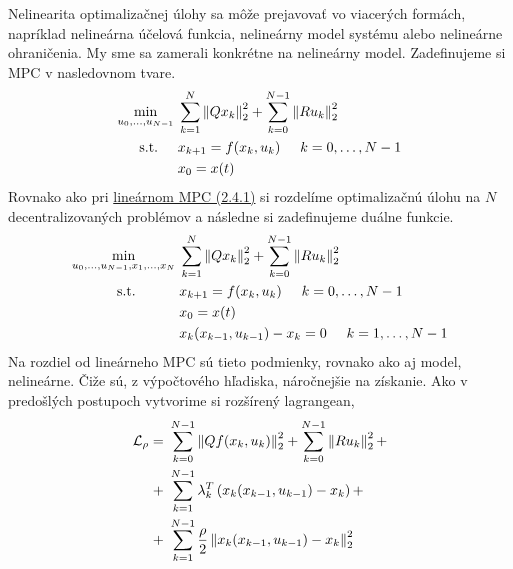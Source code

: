 Nelinearita optimalizačnej úlohy sa môže prejavovať vo viacerých formách, napríklad nelineárna účelová funkcia, nelineárny model systému alebo nelineárne ohraničenia. My sme sa zamerali konkrétne na nelineárny model. 
Zadefinujeme si MPC v nasledovnom tvare.
\begin{subequations}
	\begin{align}
	\displaystyle \min_{u_0,...,u_{N-1}} \hspace{0.1cm} &\sum_{k=1}^{N}\left\lVert Qx_k\right\rVert^{2}_{2}+\sum_{k=0}^{N-1}\left\lVert Ru_k\right\rVert^{2}_{2}\\
	\textrm{s.t.} \hspace{0.5cm} & x_{k+1} = f(x_{k},u_{k})\hspace{0.5cm} k=0,\dots,N-1\\
	& x_{0} = x(t)
	\end{align}
\end{subequations}
Rovnako ako pri \hyperref[math:ADMM_MPC]{lineárnom MPC (2.4.1)} si rozdelíme optimalizačnú úlohu na $N$ decentralizovaných problémov a následne si zadefinujeme duálne funkcie.
\begin{subequations}
	\begin{align}
	\displaystyle \min_{u_0,...,u_{N-1},x_1,...,x_N}\hspace{0.1cm} & 
	\sum_{k=1}^{N}
	\left\lVert
		Qx_k
	\right\rVert^{2}_{2}
	+
	\sum_{k=0}^{N-1}\left\lVert
		Ru_k
	\right\rVert^{2}_{2}\\
	\textrm{s.t.} \hspace{1.1cm} & x_{k+1} = f(x_{k},u_{k})\hspace{0.5cm} k=0,\dots,N-1\\
	& x_{0} = x(t)\\
	& x_{k}(x_{k-1},u_{k-1})- x_{k} = 0 \hspace{0.5cm} k=1,\dots,N-1
	\end{align}
\end{subequations}
Na rozdiel od lineárneho MPC sú tieto podmienky, rovnako ako aj model, nelineárne. Čiže sú, z výpočtového hľadiska, náročnejšie na získanie. Ako v predošlých postupoch vytvorime si rozšírený lagrangean,
\begin{equation}
\begin{split}
\mathcal{L}_{\rho} =&~ \sum_{k=0}^{N-1}
\left\lVert
	Qf(x_{k},u_{k})
\right\rVert^{2}_{2}
+
\sum_{k=0}^{N-1}\left\lVert
	Ru_k
\right\rVert^{2}_{2}+\\+&~\sum_{k=1}^{N-1}\lambda_{k}^{T}\left( x_{k}(x_{k-1},u_{k-1}) - x_{k} \right) +\\+&~\sum_{k=1}^{N-1}\frac{\rho}{2} \left\lVert x_{k}(x_{k-1},u_{k-1}) - x_{k}\right\rVert_{2}^{2}
\end{split}
\end{equation}
